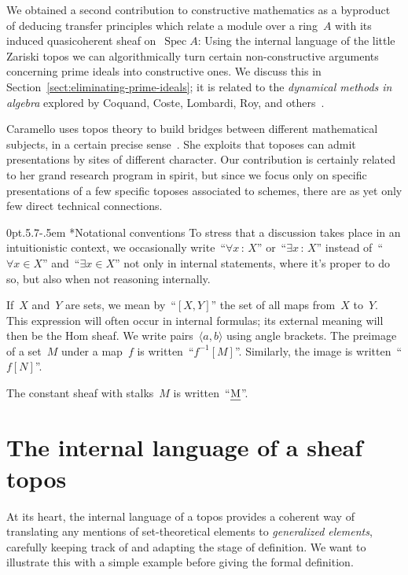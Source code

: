 \documentclass[10pt,reqno,a4paper]{amsbook}
\makeatletter
\theoremstyle{definition}
\theoremstyle{plain}
\theoremstyle{remark}
\let\oldul\ul
\renewcommand{\ul}[1]{\text{\oldul{$#1$}}}
\DeclareMathOperator{\Spec}{Spec}
\newcommand{\?}{\,{:}\,}
\renewcommand{\_}{\mathpunct{.}\,}
\def\subsection{\@startsection{subsection}{2}%
  {0pt}{.5\linespacing\@plus.7\linespacing}{-.5em}%
  {\normalfont\bfseries}}
\makeatother
\begin{document}
{We obtained a second contribution to constructive mathematics as a byproduct of
deducing transfer principles which relate a module over a ring~$A$ with its
induced quasicoherent sheaf on~$\Spec A$: Using the internal language of the
little Zariski topos we can algorithmically turn certain non-constructive
arguments concerning prime ideals into constructive ones. We discuss this in
Section~\ref{sect:eliminating-prime-ideals}; it is related to the
\emph{dynamical methods in algebra} explored by Coquand, Coste, Lombardi, Roy,
and others~\cite{clr:dynamicalmethod,cl:logical}.

Caramello uses topos theory to build bridges between different mathematical
subjects, in a certain precise sense~\cite{caramello:1,caramello:2}. She
exploits that toposes can admit presentations by sites of different character. Our
contribution is certainly related to her grand research program in spirit, but since we
focus only on specific presentations of a few specific toposes associated to
schemes, there are as yet only few direct technical connections.


\subsection*{Notational conventions} To stress that a discussion takes place in
an intuitionistic context, we occasionally write~``$\forall x\?X$''
or~``$\exists x\?X$'' instead of~``$\forall x \in X$'' and~``$\exists x \in
X$'' not only in internal statements, where it's proper to do so, but also when
not reasoning internally.

If~$X$ and~$Y$ are sets, we mean by~``$[X,Y]$'' the set of all maps from~$X$
to~$Y$. This expression will often occur in internal formulas; its external
meaning will then be the Hom sheaf. We write pairs~$\langle a, b \rangle$ using
angle brackets. The preimage of a set~$M$ under a map~$f$ is
written~``$f^{-1}[M]$''. Similarly, the image is written~``$f[N]$''.

The constant sheaf with stalks~$M$ is written~``$\ul{M}$''.

}


\section{The internal language of a sheaf topos}\label{sect:internal-language}

At its heart, the internal language of a topos provides a coherent way of
translating any mentions of set-theoretical elements to
\emph{generalized elements}, carefully keeping track of and adapting
the stage of definition. We want to illustrate this with a simple example
before giving the formal definition.
\end{document}
